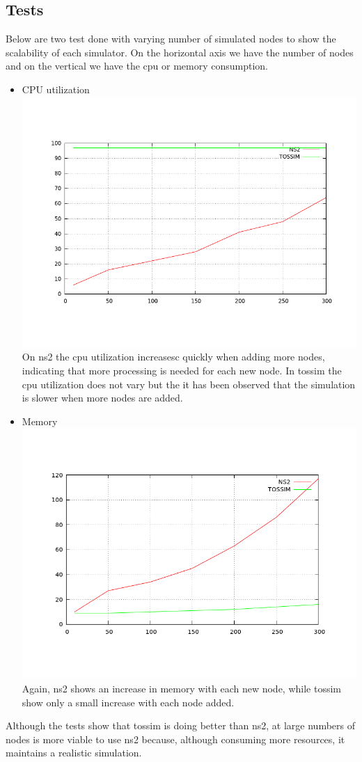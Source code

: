 \subsection{Tests}
Below are two test done with varying number of simulated nodes to show the scalability of each simulator.
On the horizontal axis we have the number of nodes and on the vertical we have the cpu or memory consumption.
\begin{itemize}
    \item{CPU utilization} 
	\includegraphics[scale=0.35]{img/cpu.png}
	On ns2 the cpu utilization increasesc quickly when adding more nodes, indicating that
	more processing is needed for each new node. In tossim the cpu utilization does not vary
	but the it has been observed that the simulation is slower when more nodes are added.
    \item{Memory}
	\includegraphics[scale=0.35]{img/mem.png}
	Again, ns2 shows an increase in memory with each new node, while tossim show only a small
	increase with each node added.
\end{itemize}

Although the tests show that tossim is doing better than ns2, at large numbers of nodes is more viable
to use ns2 because, although consuming more resources, it maintains a realistic simulation.
